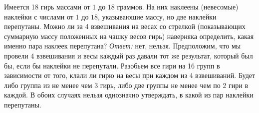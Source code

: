 \problem
Имеется 18 гирь массами от $1$ до $18$ граммов.
На них наклеены (невесомые) наклейки с числами от $1$ до $18$, указывающие
массу, но две наклейки перепутаны.
Можно ли за 4 взвешивания на весах со стрелкой
(показывающих суммарную массу положенных на чашку весов гирь)
наверняка определить, какая именно пара наклеек перепутана?
\solution
\emph{Ответ:} нет, нельзя.
Предположим, что мы провели 4 взвешивания и весы каждый раз давали тот же
результат, который был бы, если бы наклейки не перепутали.
Разобьем все гири на 16 групп в зависимости от того, клали ли гирю на весы при
каждом из 4 взвешиваний.
Будет либо группа из не менее чем 3 гирь, либо две группы не менее чем по 2
гири в каждой.
В обоих случаях нельзя однозначно утверждать, в какой из пар наклейки
перепутаны.
\endproblem

